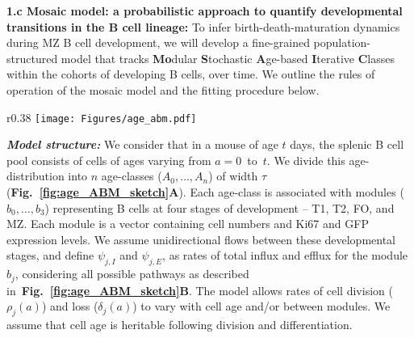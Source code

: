 \documentclass[11pt]{article}
\begin{document}
\textbf{{1.c Mosaic model: a probabilistic approach to quantify developmental transitions in the B cell lineage:}}
To infer birth-death-maturation dynamics during MZ B cell development, we will develop a fine-grained population-structured model that tracks \textbf{Mo}dular \textbf{S}tochastic \textbf{A}ge-based \textbf{I}terative \textbf{C}lasses within the cohorts of developing B cells, over time.
We outline the rules of operation of the mosaic model and the fitting procedure below.

\begin{wrapfigure}{r}{0.38\textwidth}
\centering
\texttt{[image: Figures/age\_abm.pdf]}
\vspace*{-6mm}
\caption{\textbf{Schematics of the Mosaic model.} A cell's age is defined as the time since its ancestor left the bone marrow (BM).} %
\vspace*{-5mm}
\label{fig:age_ABM_sketch}
\end{wrapfigure}

\textbf{\textit{Model structure:}}
We consider that in a mouse of age $t$ days, the splenic B cell pool consists of cells of ages varying from $a=0$~to~$t$.
We divide this age-distribution into $n$ age-classes ($A_{0} ,\ldots, A_{n}$)  of width $\tau$ (\textbf{Fig.~\ref{fig:age_ABM_sketch}A}).
Each age-class is associated with modules ($b_{0} ,\ldots, b_{3}$) representing B cells at four stages of development -- T1, T2, FO, and MZ. Each module is a vector containing cell numbers and Ki67 and GFP expression levels. %
We assume unidirectional flows between these developmental stages, and define $\psi_{j, I}$ and $\psi_{j, E}$, as rates of total influx and efflux for the module $b_j$, considering all possible pathways as described in~\textbf{Fig.~\ref{fig:age_ABM_sketch}B}.
The model allows rates of cell division ($\rho_{j}(a)$) and loss ($\delta_{j}(a)$) to vary with cell age and/or between modules. 
We assume that cell age is heritable following division and differentiation.
\end{document}
